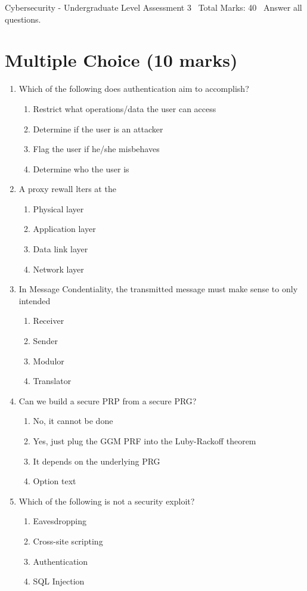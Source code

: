 \documentclass[12pt]{article}
\begin{document}
\begin{center}
Cybersecurity - Undergraduate Level Assessment 3 \
Total Marks: 40 \
Answer all questions.
\end{center}

\section*{Multiple Choice (10 marks)}
\begin{enumerate}[label=\arabic*.]
\item Which of the following does authentication aim to accomplish?
\begin{enumerate}[label=(\alph*)]
    \item Restrict what operations/data the user can access
    \item Determine if the user is an attacker
    \item Flag the user if he/she misbehaves
    \item Determine who the user is
\end{enumerate}
\item A proxy rewall lters at the
\begin{enumerate}[label=(\alph*)]
    \item Physical layer
    \item Application layer
    \item Data link layer
    \item Network layer
\end{enumerate}
\item In Message Condentiality, the transmitted message must make sense to only intended
\begin{enumerate}[label=(\alph*)]
    \item Receiver
    \item Sender
    \item Modulor
    \item Translator
\end{enumerate}
\item Can we build a secure PRP from a secure PRG?
\begin{enumerate}[label=(\alph*)]
    \item No, it cannot be done
    \item Yes, just plug the GGM PRF into the Luby-Rackoff theorem
    \item It depends on the underlying PRG
    \item Option text
\end{enumerate}
\item Which of the following is not a security exploit?
\begin{enumerate}[label=(\alph*)]
    \item Eavesdropping
    \item Cross-site scripting
    \item Authentication
    \item SQL Injection
\end{enumerate}
\end{enumerate}
\end{document}
